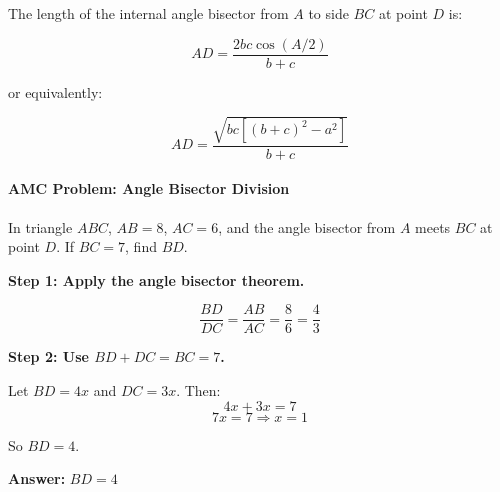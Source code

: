 ﻿\documentclass[12pt]{extarticle}
\begin{document}
\begin{theorembox}
The length of the internal angle bisector from $A$ to side $BC$ at point $D$ is:

\[AD = \frac{2bc \cos(A/2)}{b+c}\]

or equivalently:

\[AD = \frac{\sqrt{bc[(b+c)^2 - a^2]}}{b+c}\]

\begin{center}
\end{center}
\end{theorembox}

\paragraph{AMC Problem: Angle Bisector Division}

In triangle $ABC$, $AB = 8$, $AC = 6$, and the angle bisector from $A$ meets $BC$ at point $D$. If $BC = 7$, find $BD$.

\begin{solutionbox}
\textbf{Step 1: Apply the angle bisector theorem.}

\[\frac{BD}{DC} = \frac{AB}{AC} = \frac{8}{6} = \frac{4}{3}\]

\textbf{Step 2: Use $BD + DC = BC = 7$.}

Let $BD = 4x$ and $DC = 3x$. Then:
\[4x + 3x = 7\]
\[7x = 7 \Rightarrow x = 1\]

So $BD = 4$.

\textbf{Answer:} $\boxed{BD = 4}$
\end{solutionbox}
\end{document}
